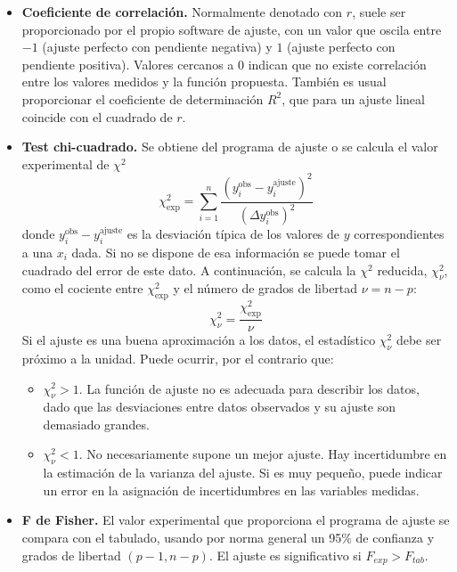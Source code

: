 \documentclass{book}
\begin{document}
\begin{itemize}
  \item \textbf{Coeficiente de correlación.} Normalmente denotado con $r$, suele ser proporcionado
  por el propio software de ajuste, con un valor que oscila entre $-1$ (ajuste perfecto con
  pendiente negativa) y $1$ (ajuste perfecto con pendiente positiva). Valores cercanos a $0$ 
  indican que no existe correlación entre los valores medidos y la función propuesta.
  También es usual proporcionar el coeficiente de determinación $R^2$, que para un ajuste lineal 
  coincide con el cuadrado de $r$.
  \item \textbf{Test chi-cuadrado.} Se obtiene del programa de ajuste o se calcula el valor
  experimental de $\chi^2$
  \begin{equation}
    \chi_{\textrm{exp}}^2 = \sum_{i=1}^n \frac{(y_i^{\textrm{obs}} - y_i^{\textrm{ajuste}})^2}{(\Delta y_i^{\textrm{obs}})^2}
  \end{equation}
  donde $y_i^{\textrm{obs}} - y_i^{\textrm{ajuste}}$ es la desviación típica de los valores de $y$
  correspondientes a una $x_i$ dada. Si no se dispone de esa información se puede tomar el cuadrado
  del error de este dato. A continuación, se calcula la $\chi^2$ reducida, $\chi^2_{\nu}$, como el
  cociente entre $\chi_{\textrm{exp}}^2$ y el número de grados de libertad $\nu = n - p$:
  \begin{equation}
    \chi^2_{\nu} = \frac{\chi_{\textrm{exp}}^2}{\nu}
  \end{equation}
  Si el ajuste es una buena aproximación a los datos, el estadístico $\chi^2_{\nu}$ debe ser próximo 
  a la unidad. Puede ocurrir, por el contrario que:
  \begin{itemize}
    \item $\chi^2_{\nu} > 1$. La función de ajuste no es adecuada para describir los datos, dado que
    las desviaciones entre datos observados y su ajuste son demasiado grandes.
    \item $\chi^2_{\nu} < 1$. No necesariamente supone un mejor ajuste. Hay incertidumbre en la estimación
    de la varianza del ajuste. Si es muy pequeño, puede indicar un error en la asignación de incertidumbres
    en las variables medidas.
  \end{itemize}

  \item \textbf{F de Fisher.} El valor experimental que proporciona el programa de ajuste se compara
  con el tabulado, usando por norma general un 95\% de confianza y grados de libertad $(p-1, n-p)$.
  El ajuste es significativo si $F_{exp} > F_{tab}$.
\end{itemize}
\end{document}
